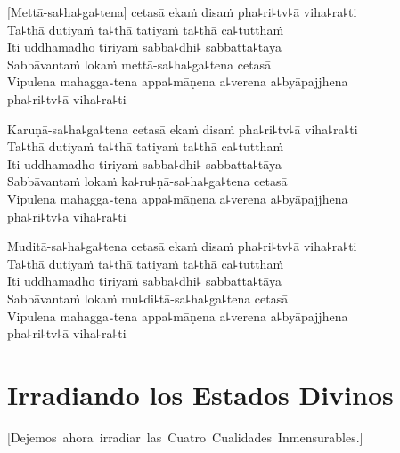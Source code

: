 \delegateSetUseNext


\begin{leader}
\end{leader}

[Mettā-sa꜕ha꜕ga꜕tena] cetasā ekaṁ disaṁ pha꜕ri꜕tv꜕ā viha꜕ra꜕ti\\
Ta꜕thā dutiyaṁ ta꜕thā tatiyaṁ ta꜕thā ca꜕tutthaṁ\\
Iti uddhamadho tiriyaṁ sabba꜕dhi꜕ sabbatta꜕tāya\\
Sabbāvantaṁ lokaṁ mettā-sa꜕ha꜕ga꜕tena cetasā\\
Vipulena mahagga꜕tena appa꜕māṇena a꜕verena a꜕byāpajjhena\\
\vin pha꜕ri꜕tv꜕ā viha꜕ra꜕ti

Karuṇā-sa꜕ha꜕ga꜕tena cetasā ekaṁ disaṁ pha꜕ri꜕tv꜕ā viha꜕ra꜕ti\\
Ta꜕thā dutiyaṁ ta꜕thā tatiyaṁ ta꜕thā ca꜕tutthaṁ\\
Iti uddhamadho tiriyaṁ sabba꜕dhi꜕ sabbatta꜕tāya\\
Sabbāvantaṁ lokaṁ ka꜕ru꜕ṇā-sa꜕ha꜕ga꜕tena cetasā\\
Vipulena mahagga꜕tena appa꜕māṇena a꜕verena a꜕byāpajjhena\\
\vin pha꜕ri꜕tv꜕ā viha꜕ra꜕ti

Muditā-sa꜕ha꜕ga꜕tena cetasā ekaṁ disaṁ pha꜕ri꜕tv꜕ā viha꜕ra꜕ti\\
Ta꜕thā dutiyaṁ ta꜕thā tatiyaṁ ta꜕thā ca꜕tutthaṁ\\
Iti uddhamadho tiriyaṁ sabba꜕dhi꜕ sabbatta꜕tāya\\
Sabbāvantaṁ lokaṁ mu꜕di꜕tā-sa꜕ha꜕ga꜕tena cetasā\\
Vipulena mahagga꜕tena appa꜕māṇena a꜕verena a꜕byāpajjhena\\
\vin pha꜕ri꜕tv꜕ā viha꜕ra꜕ti

\chapter[Irradiando los Estados  Divinos]{Irradiando los Estados Divinos}

\enlargethispage{\baselineskip}


\begin{leader}
  \vspace*{-\baselineskip}
  \mbox{[Dejemos ahora irradiar las Cuatro Cualidades Inmensurables.]}
\end{leader}

